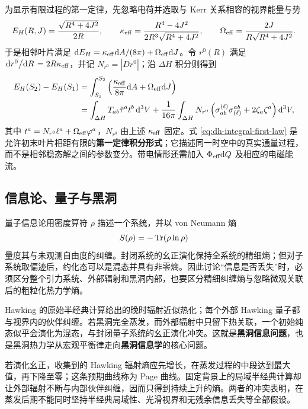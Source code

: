 为显示有限过程的第一定律，先忽略电荷并选取与 Kerr 关系相容的视界能量与势
\[
    E_H(R,J)=\frac{\sqrt{R^4+4J^2}}{2R},\qquad
    \kappa_{\rm eff}=\frac{R^4-4J^2}
      {2R^3\sqrt{R^4+4J^2}},\qquad
    \Omega_{\rm eff}=\frac{2J}{R\sqrt{R^4+4J^2}}.
\]
于是相邻叶片满足 $\dd E_H=\kappa_{\rm eff}\dd A/(8\pi)+\Omega_{\rm eff}\dd J$。令 $r^0(R)$ 满足 $\dv*{r^0}{R}=2R\kappa_{\rm eff}$，并记 $N_{r^0}=|D r^0|$；沿 $\Delta H$ 积分则得到
\begin{equation}\label{eq:dh-integral-first-law}
\begin{split}
    E_H(S_2)-E_H(S_1)
      &=
      \int_{S_1}^{S_2}
      \left(\frac{\kappa_{\rm eff}}{8\pi}\dd A
      +\Omega_{\rm eff}\dd J\right)\\
      &=\int_{\Delta H}T_{ab}\hat\tau^at^b\,\dd^3V
      +\frac{1}{16\pi}\int_{\Delta H}N_{r^0}
        \left(\sigma^{(\ell)}_{ab}\sigma_{(\ell)}^{ab}
        +2\zeta_a\zeta^a\right)\dd^3V ,
\end{split}
\end{equation}
其中 $t^a=N_{r^0}\ell^a+\Omega_{\rm eff}\varphi^a$，$N_{r^0}$ 由上述 $\kappa_{\rm eff}$ 固定。式 \eqref{eq:dh-integral-first-law} 是允许初末叶片相距有限的\textbf{第一定律积分形式}；它描述同一时空中的真实通量过程，而不是相邻稳态解之间的参数变分。带电情形还需加入 $\Phi_{\rm eff}\dd Q$ 及相应的电磁能流。

\subsection{信息论、量子与黑洞}

量子信息论用密度算符 $\rho$ 描述一个系统，并以 von Neumann 熵
\[
    S(\rho)=-\Tr(\rho\ln\rho)
\]
量度其与未观测自由度的纠缠。封闭系统的幺正演化保持全系统的精细熵；但对子系统取偏迹后，约化态可以是混态并具有非零熵。因此讨论“信息是否丢失”时，必须区分整个引力系统、外部辐射和黑洞内部，也要区分精细纠缠熵与忽略微观关联后的粗粒化热力学熵。

Hawking 的原始半经典计算给出的晚时辐射近似热化；每个外部 Hawking 量子都与视界内的伙伴纠缠。若黑洞完全蒸发，而外部辐射中只留下热关联，一个初始纯态似乎会演化为混态，与封闭量子系统的幺正演化冲突。这就是\textbf{黑洞信息问题}，也是黑洞热力学从宏观平衡律走向\textbf{黑洞信息学}的核心问题。

若演化幺正，收集到的 Hawking 辐射熵应先增长，在蒸发过程的中段达到最大值，再下降至零；这条预期曲线称为 Page 曲线。固定背景上的局域半经典计算却让外部辐射不断与内部伙伴纠缠，因而只得到持续上升的熵。两者的冲突表明，在蒸发后期不能同时坚持半经典局域性、光滑视界和无残余信息丢失等全部假设。

